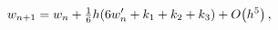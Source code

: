 \[w_{n+1}=w_{n}+\tfrac{1}{6}h(6w^{\prime}_{n}+k_{1}+k_{2}+k_{3})+\mathop{O\/}%
\nolimits\!\left(h^{5}\right),\]